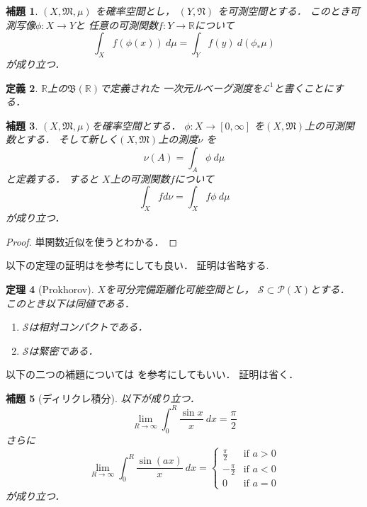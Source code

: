 \documentclass[leqno, 12pt]{jsarticle}
\newtheorem{thm}{定理}
\newtheorem{lem}[thm]{補題}
\newtheorem{df}[thm]{定義}
\newcommand{\rr}{\mathbb{R}}
\begin{document}
\begin{lem}\label{lem:push}
$(X, \mathfrak{M}, \mu)$
を確率空間とし，
$(Y, \mathfrak{N})$
を可測空間とする．
このとき可測写像$\phi:X\to Y$と
任意の可測関数$f: Y\to \rr$について
\[
\int_{X}f(\phi(x))\ d\mu
=\int_{Y} f(y)\ d(\phi_{*}\mu)
\]
が成り立つ．
\end{lem}

\begin{df}
$\rr$上の$\mathfrak{B}(\rr)$で定義された
一次元ルベーグ測度を$\mathcal{L}^{1}$と書くことにする．
\end{df}




\begin{lem}
$(X, \mathfrak{M}, \mu)$を確率空間とする．
$\phi: X\to [0, \infty]$
を$(X, \mathfrak{M})$上の可測関数とする．
そして新しく$(X, \mathfrak{M})$上の測度$\nu$
を
\[
\nu(A)=\int_{A}\phi\ d\mu
\]
と定義する．
すると
$X$上の可測関数$f$について
\[
\int_{X}f d\nu=\int_{X} f\phi \ d\mu
\]
が成り立つ．
\end{lem}
\begin{proof}
単関数近似を使うとわかる．
\end{proof}

以下の定理の証明は\cite{hatena2}を参考にしても良い．
証明は省略する.

\begin{thm}[Prokhorov]\label{thm:prokh}
$X$を可分完備距離化可能空間とし，
$\mathcal{S}\subset \mathcal{P}(X)$とする．
このとき以下は同値である．
\begin{enumerate}
\item $\mathcal{S}$は相対コンパクトである．
\item $\mathcal{S}$は緊密である．
\end{enumerate}
\end{thm}

以下の二つの補題については
\cite{hatenasekibun}
を参考にしてもいい．
証明は省く．

\begin{lem}[ディリクレ積分]\label{lem:dint}
以下が成り立つ．
\[
\lim_{R\to \infty}\int_0^{R}\frac{\sin x}{x}\ dx=\frac{\pi}{2}
\]
さらに
\[
\lim_{R\to \infty}
\int_0^{R}\frac{\sin (ax)}{x}\ dx
=
	\begin{cases}
		\frac{\pi}{2} & \text{if $a>0$}\\
		-\frac{\pi}{2} & \text{if $a<0$}\\
		0 & \text{if $a=0$}
	\end{cases}
\]
が成り立つ．
\end{lem}
\end{document}
